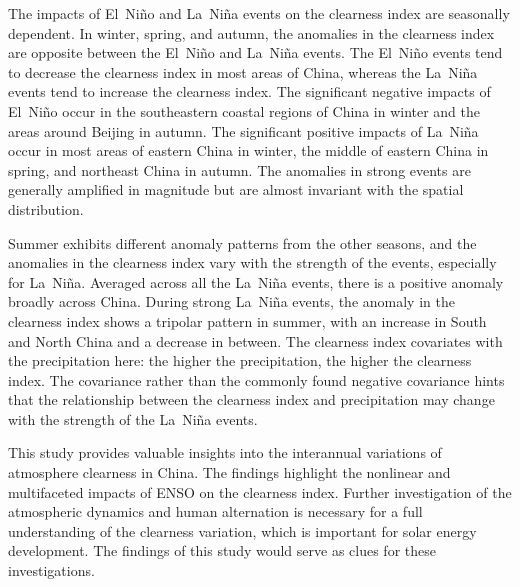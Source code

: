 \documentclass[atmosphere,article,accept,pdftex,moreauthors]{Definitions/mdpi}
\begin{document}
The impacts of El~Niño and La~Niña events on the clearness index are seasonally dependent. In winter, spring, and autumn, the anomalies in the clearness index are opposite between the El~Niño and La~Niña events. The El~Niño events tend to decrease the clearness index in most areas of China, whereas the La~Niña events tend to increase the clearness index. The significant negative impacts of El~Niño occur in the southeastern coastal regions of China in winter and the areas around Beijing in autumn. The significant positive impacts of La~Niña occur in most areas of eastern China in winter, the middle of eastern China in spring, and northeast China in autumn. The anomalies in strong events are generally amplified in magnitude but are almost invariant with the spatial distribution.

Summer exhibits different anomaly patterns from the other seasons, and the anomalies in the clearness index vary with the strength of the events, especially for La~Niña. Averaged across all the La~Niña events, there is a positive anomaly broadly across China. During strong La~Niña events, the anomaly in the clearness index shows a tripolar pattern in summer, with an increase in South and North China and a decrease in between. The clearness index covariates with the precipitation here: the higher the precipitation, the higher the clearness index. The covariance rather than the commonly found negative covariance hints that the relationship between the clearness index and precipitation may change with the strength of the La~Niña events.

This study provides valuable insights into the interannual variations of atmosphere clearness in China. The findings highlight the nonlinear and multifaceted impacts of ENSO on the clearness index. Further investigation of the atmospheric dynamics and human alternation is necessary for a full understanding of the clearness variation, which is important for solar energy development. The findings of this study would serve as clues for these investigations.

\vspace{6pt}

\end{document}
